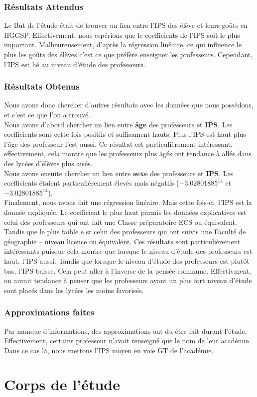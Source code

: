 \documentclass[a4paper, 11pt]{article}
\begin{document}
\subsubsection{Résultats Attendus}

Le But de l'étude était de trouver un lien entre l'IPS des élève et leurs goûts en HGGSP. Effectivement, nous espérions que le coefficients de l'IPS soit le plus important. Malheureusement, d'après la régression linéaire, ce qui influence le plus les goûts des élèves c'est ce que préfère enseigner les professeurs. Cependant, l’IPS est lié au niveau d’étude des professeurs.

\subsubsection{Résultats Obtenus}

Nous avons donc chercher d'autres résultats avec les données que nous possédons, et c'est ce que l'on a trouvé.\\
Nous avons d'abord chercher un lien entre \textbf{âge} des professeurs et \textbf{IPS}. Les coefficients sont cette fois positifs et suffisament hauts. Plus l'IPS est haut plus l'âge des professeur l'est aussi. Ce résultat est particulièrement intéressant, effectivement, cela montre que les professeurs plus âgés ont tendance à allés dans des lycées d'élèves plus aisés.\\
Nous avons ensuite chercher un lien entre \textbf{sexe} des professeurs et \textbf{IPS}. Les coefficients étaient particulièrement élevés mais négatifs ($-3.02801885^{14}$ et $-3.02801885^{14}$).\\
Finalement, nous avons fait une régression linéaire. Mais cette fois-ci, l'IPS est la donnée expliquée. Le coefficient le plus haut parmis les données explicatives est celui des professeurs qui ont fait une Classe préparatoire ECS ou équivalent. Tandis que le plus faible e st celui des professeurs qui ont suivis une Faculté de géographie – niveau licence ou équivalent. Ces résultats sont particulièrement intéressants puisque cela montre que lorsque le niveau d'étude des professeurs est haut, l'IPS aussi. Tandis que lorsque le niveau d'étude des professeurs est plutôt bas, l'IPS baisse. Cela peut aller à l'inverse de la pensée commune. Effectivment, on aurait tendance à penser que les professeurs ayant un plus fort niveau d'étude sont placés dans les lycées les moins favorisés.

\subsubsection{Approximations faites}
Par manque d'informations, des approximations ont du être fait durant l'étude. Effectivement, certains professeur n'avait renseigné que le nom de leur académie. Dans ce cas là, nous mettons l'IPS moyen en voie GT de l'académie.

\newpage

\section{Corps de l'étude}
\end{document}
